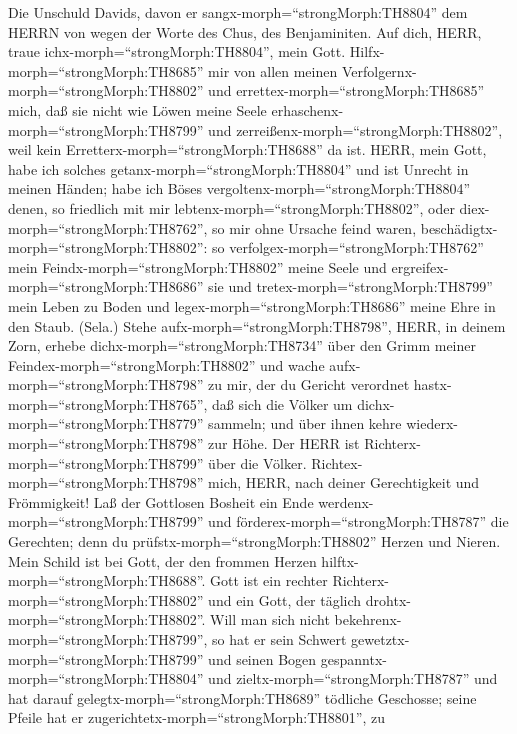  Die Unschuld Davids, davon er
sangx-morph=``strongMorph:TH8804'' dem HERRN von wegen der Worte des
Chus, des Benjaminiten. Auf dich, HERR, traue
ichx-morph=``strongMorph:TH8804'', mein Gott.
Hilfx-morph=``strongMorph:TH8685'' mir von allen meinen
Verfolgernx-morph=``strongMorph:TH8802'' und
errettex-morph=``strongMorph:TH8685'' mich,  daß sie nicht
wie Löwen meine Seele erhaschenx-morph=``strongMorph:TH8799'' und
zerreißenx-morph=``strongMorph:TH8802'', weil kein
Erretterx-morph=``strongMorph:TH8688'' da ist.  HERR, mein
Gott, habe ich solches getanx-morph=``strongMorph:TH8804'' und ist
Unrecht in meinen Händen;  habe ich Böses
vergoltenx-morph=``strongMorph:TH8804'' denen, so friedlich mit mir
lebtenx-morph=``strongMorph:TH8802'', oder
diex-morph=``strongMorph:TH8762'', so mir ohne Ursache feind waren,
beschädigtx-morph=``strongMorph:TH8802'':  so
verfolgex-morph=``strongMorph:TH8762'' mein
Feindx-morph=``strongMorph:TH8802'' meine Seele und
ergreifex-morph=``strongMorph:TH8686'' sie und
tretex-morph=``strongMorph:TH8799'' mein Leben zu Boden und
legex-morph=``strongMorph:TH8686'' meine Ehre in den Staub. (Sela.)
 Stehe aufx-morph=``strongMorph:TH8798'', HERR, in deinem
Zorn, erhebe dichx-morph=``strongMorph:TH8734'' über den Grimm meiner
Feindex-morph=``strongMorph:TH8802'' und wache
aufx-morph=``strongMorph:TH8798'' zu mir, der du Gericht verordnet
hastx-morph=``strongMorph:TH8765'',  daß sich die Völker um
dichx-morph=``strongMorph:TH8779'' sammeln; und über ihnen kehre
wiederx-morph=``strongMorph:TH8798'' zur Höhe.  Der HERR ist
Richterx-morph=``strongMorph:TH8799'' über die Völker.
Richtex-morph=``strongMorph:TH8798'' mich, HERR, nach deiner
Gerechtigkeit und Frömmigkeit!  Laß der Gottlosen Bosheit
ein Ende werdenx-morph=``strongMorph:TH8799'' und
förderex-morph=``strongMorph:TH8787'' die Gerechten; denn du
prüfstx-morph=``strongMorph:TH8802'' Herzen und Nieren. 
Mein Schild ist bei Gott, der den frommen Herzen
hilftx-morph=``strongMorph:TH8688''.  Gott ist ein rechter
Richterx-morph=``strongMorph:TH8802'' und ein Gott, der täglich
drohtx-morph=``strongMorph:TH8802''.  Will man sich nicht
bekehrenx-morph=``strongMorph:TH8799'', so hat er sein Schwert
gewetztx-morph=``strongMorph:TH8799'' und seinen Bogen
gespanntx-morph=``strongMorph:TH8804'' und
zieltx-morph=``strongMorph:TH8787''  und hat darauf
gelegtx-morph=``strongMorph:TH8689'' tödliche Geschosse; seine Pfeile
hat er zugerichtetx-morph=``strongMorph:TH8801'', zu
